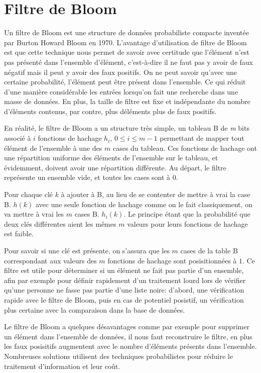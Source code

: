 \chapter{Filtre de Bloom}
	Un filtre de Bloom est une structure de données probabiliste compacte inventée par Burton Howard Bloom en 1970. L'avantage d'utilisation de filtre de Bloom est que cette technique nous permet de savoir avec certitude que l'élément n'est pas présenté dans l'ensemble d'élément, c'est-à-dire il ne faut pas y avoir de faux négatif mais il peut y avoir des faux positifs. On ne peut savoir qu'avec une certaine probabilité, l'élément peut être présent dans l'ensemble. Ce qui réduit d'une manière considérable les entrées lorsqu'on fait une recherche dans une masse de données. En plus, la taille de filtre est fixe et indépendante du nombre d'éléments contenus, par contre, plus déléments plus de faux positifs.
	
	En réalité, le filtre de Bloom a un structure très simple, un tableau B de \textit{m} bits associé à $i$ fonctions de hachage $h_i$, $0 \leq i \leq m - 1$ permettant de mapper tout élément de l'ensemble à une des $m$ cases du tableau. Ces fonctions de hachage ont une répartition uniforme des éléments de l'ensemble sur le tableau, et évidemment, doivent avoir une répartition différente. Au départ, le filtre représente un ensemble vide, et toutes les cases sont à 0.
	
	Pour chaque clé $k$ à ajouter à B, au lieu de se contenter de mettre à vrai la case B. $h(k)$ avec une seule fonction de hachage comme on le fait classiquement, on va mettre à vrai les $m$ cases B. $h_i(k)$. Le principe étant que la probabilité que deux clés différentes aient les mêmes $m$ valeurs pour leurs fonctions de hachage est faible.
	
	Pour savoir si une clé est présente, on s'assura que les $m$ cases de la table B correspondant aux valeurs des $m$ fonctions de hachage sont posisitionnées à $1$. Ce filtre est utile pour déterminer si un élément ne fait pas partie d'un ensemble, afin par exemple pour définir rapidement d'un traitement lourd lors de vérifier qu'une personne ne fasse pas partie d'une liste noire: d'abord, une vérification rapide avec le filtre de Bloom, puis en cas de potentiel posistif, un vérification plus certaine avec la comparaison dans la base de données.
	
	Le filtre de Bloom a quelques désavantages comme par exemple pour supprimer un élément dans l'ensemble de données, il nous faut reconstruire le filtre, en plus les faux posisitifs augmentent avec le nombre d'éléments présents dans l'ensemble. Nombreuses solutions utilisent des techniques probabilistes pour réduire le traitement d'information et leur coût.
	

